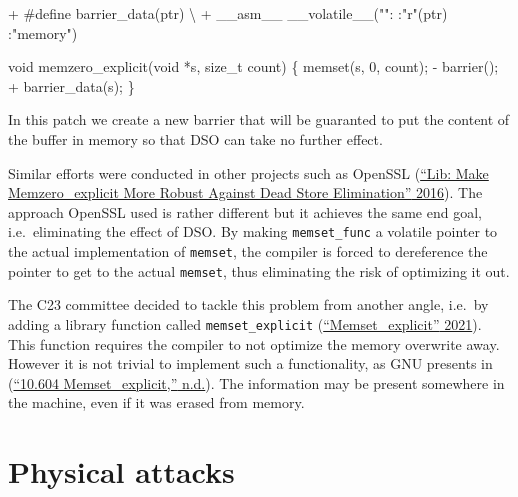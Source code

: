 \documentclass[
  a4paper,
]{report}
\newenvironment{Shaded}{}{}
\newcommand{\DataTypeTok}[1]{\textcolor[rgb]{0.56,0.13,0.00}{#1}}
\newcommand{\DecValTok}[1]{\textcolor[rgb]{0.25,0.63,0.44}{#1}}
\newcommand{\NormalTok}[1]{#1}
\newcommand{\OperatorTok}[1]{\textcolor[rgb]{0.40,0.40,0.40}{#1}}
\newcommand{\StringTok}[1]{\textcolor[rgb]{0.25,0.44,0.63}{#1}}
\begin{document}
\begin{Shaded}
\begin{Highlighting}[]
\OperatorTok{+}\NormalTok{ \#define barrier\_data}\OperatorTok{(}\NormalTok{ptr}\OperatorTok{)}\NormalTok{ \textbackslash{}}
\OperatorTok{+}\NormalTok{  \_\_asm\_\_ \_\_volatile\_\_}\OperatorTok{(}\StringTok{""}\OperatorTok{:} \OperatorTok{:}\StringTok{"r"}\OperatorTok{(}\NormalTok{ptr}\OperatorTok{)} \OperatorTok{:}\StringTok{"memory"}\OperatorTok{)}

\DataTypeTok{void}\NormalTok{ memzero\_explicit}\OperatorTok{(}\DataTypeTok{void} \OperatorTok{*}\NormalTok{s}\OperatorTok{,} \DataTypeTok{size\_t}\NormalTok{ count}\OperatorTok{)}
\OperatorTok{\{}
\NormalTok{  memset}\OperatorTok{(}\NormalTok{s}\OperatorTok{,} \DecValTok{0}\OperatorTok{,}\NormalTok{ count}\OperatorTok{);}
  \OperatorTok{{-}}\NormalTok{ barrier}\OperatorTok{();}
  \OperatorTok{+}\NormalTok{ barrier\_data}\OperatorTok{(}\NormalTok{s}\OperatorTok{);}
\OperatorTok{\}}
\end{Highlighting}
\end{Shaded}

In this patch we create a new barrier that will be guaranted to put the
content of the buffer in memory so that DSO can take no further effect.

Similar efforts were conducted in other projects such as OpenSSL
(\protect\hyperlink{ref-OpenSSLMemClr}{{``Lib: Make Memzero\_explicit
More Robust Against Dead Store Elimination''} 2016}). The approach
OpenSSL used is rather different but it achieves the same end goal,
i.e.~eliminating the effect of DSO. By making \texttt{memset\_func} a
volatile pointer to the actual implementation of \texttt{memset}, the
compiler is forced to dereference the pointer to get to the actual
\texttt{memset}, thus eliminating the risk of optimizing it out.

The C23 committee decided to tackle this problem from another angle,
i.e.~by adding a library function called \texttt{memset\_explicit}
(\protect\hyperlink{ref-MemSetProposal}{{``Memset\_explicit''} 2021}).
This function requires the compiler to not optimize the memory overwrite
away. However it is not trivial to implement such a functionality, as
GNU presents in (\protect\hyperlink{ref-GNUMemSet}{{``10.604
Memset\_explicit,''} n.d.}). The information may be present somewhere in
the machine, even if it was erased from memory.

\hypertarget{physical-attacks}{%
\chapter{Physical attacks}\label{physical-attacks}}
\end{document}
